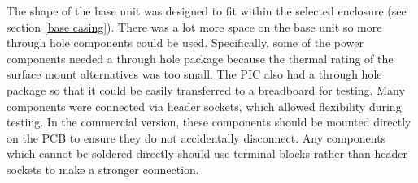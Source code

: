 The shape of the base unit was designed to fit within the selected enclosure (see section \ref{base casing}). There was a lot more space on the base unit so more through hole components could be used. Specifically, some of the power components needed a through hole package because the thermal rating of the surface mount alternatives was too small. The PIC also had a through hole package so that it could be easily transferred to a breadboard for testing. Many components were connected via header sockets, which allowed flexibility during testing. In the commercial version, these components should be mounted directly on the PCB to ensure they do not accidentally disconnect. Any components which cannot be soldered directly should use terminal blocks rather than header sockets to make a stronger connection.\\